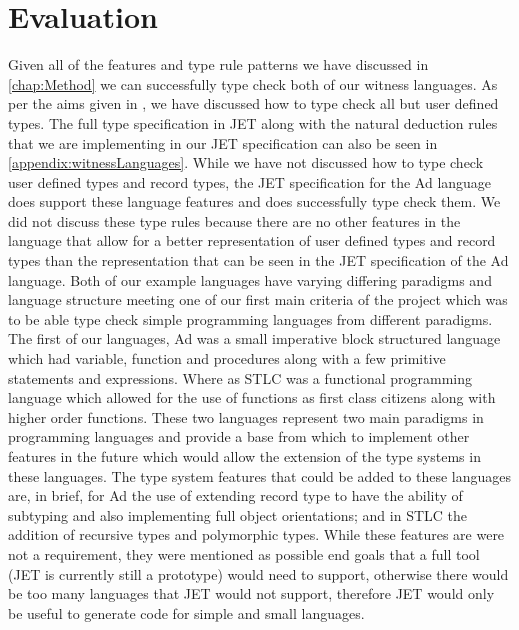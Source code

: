 \chapter{Evaluation}
Given all of the features and type rule patterns we have discussed in \autoref{chap:Method} we can successfully type check both of our witness languages.
As per the aims given in , we have discussed how to type check all but user defined types.
The full type specification in JET along with the natural deduction rules that we are implementing in our JET specification can also be seen in \autoref{appendix:witnessLanguages}.
While we have not discussed how to type check user defined types and record types, the JET specification for the Ad language does support these language features and does successfully type check them.
We did not discuss these type rules because there are no other features in the language that allow for a better representation of user defined types and record types than the representation that can be seen in the JET specification of the Ad language.
Both of our example languages have varying differing paradigms and language structure meeting one of our first main criteria of the project which was to be able type check simple programming languages from different paradigms.
The first of our languages, Ad was a small imperative block structured language which had variable, function and procedures along with a few primitive statements and expressions.
Where as STLC was a functional programming language which allowed for the use of functions as first class citizens along with higher order functions.
These two languages represent two main paradigms in programming languages and provide a base from which to implement other features in the future which would allow the extension of the type systems in these languages.
The type system features that could be added to these languages are, in brief, for Ad the use of extending record type to have the ability of subtyping and also implementing full object orientations; and in STLC the addition of recursive types\cite{pierce2002types,cardelli1996type} and polymorphic types\cite{Cardelli:1985:UTD:6041.6042}.
While these features are were not a requirement, they were mentioned as possible end goals that a full tool (JET is currently still a prototype) would need to support, otherwise there would be too many languages that JET would not support, therefore JET would  only be useful to generate code for simple and small languages.  

